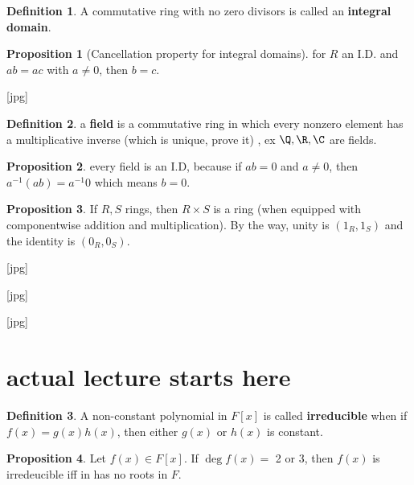 \documentclass[a5paper]{article}
\theoremstyle{definition}%
\newtheorem*{proposition*}{Proposition}
\newtheorem*{definition*}{Definition}
\numberwithin{exercise}{section}
\theoremstyle{remark}%
\begin{document}
\begin{definition*}
A commutative ring with no zero divisors is called an \textbf{integral domain}.
\end{definition*}

\begin{proposition*}[Cancellation property for integral domains]
for $R$ an I.D. and $ab=ac$ with $a\neq0$, then $b=c$. 
\end{proposition*}

[jpg]

\begin{definition*}
a \textbf{field} is a commutative ring in which every nonzero element has a multiplicative inverse (which is unique, prove it) , ex $\Q, \R, \C$ are fields. 
\end{definition*}

\begin{proposition*}
every field is an I.D, because if $ab=0$ and $a\neq0$, then $a^{-1}(ab)=a^{-1}0$ which means $b=0$. 
\end{proposition*}

\begin{proposition*}
If $R,S$ rings, then $R\times S$ is a ring (when equipped with componentwise addition and multiplication). By the way, unity is $(1_R, 1_S)$ and the identity is $(0_R, 0_S)$. 
\end{proposition*}

[jpg]

[jpg]

[jpg]


\section{actual lecture starts here}

\begin{highlight}
\begin{definition*}
A non-constant polynomial in $F[x]$ is called \textbf{irreducible} when if $f(x)=g(x)h(x)$, then either $g(x)$ or $h(x)$ is constant. 
\end{definition*}
\end{highlight}

\begin{highlight}
\begin{proposition*}
Let $f(x)\in F[x]$. If $\deg f(x)=$ 2 or 3, then $f(x)$ is irredeucible iff in has no roots in $F$. 
\end{proposition*}
\end{highlight}
\end{document}
